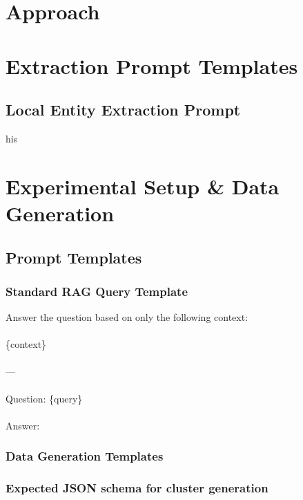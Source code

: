 \appendix

\section{Approach}
\section*{Extraction Prompt Templates}
\subsection*{Local Entity Extraction Prompt}

his


\section{Experimental Setup \& Data Generation}
\subsection*{Prompt Templates}
\subsubsection*{Standard RAG Query Template}\label{appendixB:std-rag-template}
\begin{tcolorbox}[title=Standard RAG Query]
Answer the question based on only the following context:\\\\
\{context\}\\\\
---\\\\
Question: \{query\}\\\\
Answer:
\end{tcolorbox}

\pagebreak

\subsubsection*{Data Generation Templates}
\subsubsection*{Expected JSON schema for cluster generation}

